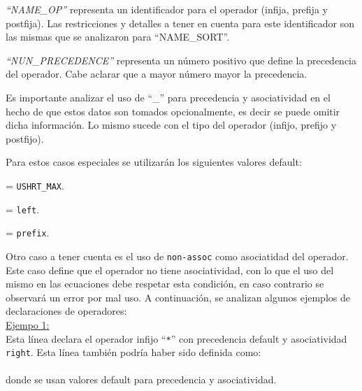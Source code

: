 \textit{``NAME\_OP''} representa un identificador para el operador (infija, prefija y postfija). Las restricciones y detalles a tener en cuenta para este identificador son las mismas que se analizaron para ``NAME\_SORT''.

\textit{``NUN\_PRECEDENCE''} representa un número positivo que define la precedencia del operador. Cabe aclarar que a mayor número mayor la precedencia.

Es importante analizar el uso de ``\_'' para precedencia y asociatividad en el hecho de que estos datos son tomados opcionalmente, es decir se puede omitir dicha información. Lo mismo sucede con el tipo del operador (infijo, prefijo y postfijo). 

Para estos casos especiales se utilizarán los siguientes valores default:

\begin{description}
\label{desc:default}
\item [Precedencia] = \texttt{USHRT\_MAX}.

\item [Asociatividad] = \texttt{left}.

\item [Tipo de operador] = \texttt{prefix}.
\end{description}

Otro caso a tener cuenta es el uso de \texttt{non-assoc} como asociatidad del operador. Este caso define que el operador no tiene asociatividad, con lo que el uso del mismo en las ecuaciones debe respetar esta condición, en caso contrario se observará un error por mal uso.
A continuación, se analizan algunos ejemplos de declaraciones de operadores:\\

\underline{Ejempo 1:}\ \\
\vspace{0.2cm}
Esta línea declara el operador infijo ``\texttt{*}'' con precedencia default y asociatividad \texttt{right}. Esta línea también podría haber sido definida como:\\
\vspace{0.2cm}
\\
\vspace{0.2cm}
donde se usan valores default para precedencia y asociatividad.\\


